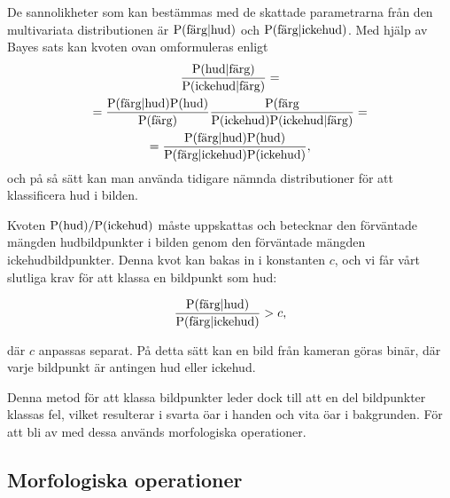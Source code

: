 \documentclass[../rapport_MVEX01-11-05]{subfiles}
\begin{document}
De sannolikheter som kan bestämmas med de skattade parametrarna från den
multivariata distributionen är
$\mathrm{P}(\textrm{färg}|\textrm{hud})$ och
$\mathrm{P}(\textrm{färg}|\textrm{ickehud})$. Med hjälp av Bayes sats
kan kvoten ovan omformuleras enligt
\begin{multline*}
\frac{\mathrm{P}(\textrm{hud}|\textrm{färg})}{\mathrm{P}(\textrm{ickehud}|\textrm{färg})}=\\
=\frac{\mathrm{P}(\textrm{färg}|\textrm{hud})\mathrm{P}(\textrm{hud})}{\mathrm{P}(\textrm{färg})}
 \frac{\mathrm{P}(\textrm{färg}}{\mathrm{P}(\textrm{ickehud})\mathrm{P}(\textrm{ickehud}|\textrm{färg})}=\\
=\frac{\mathrm{P}(\textrm{färg}|\textrm{hud})\mathrm{P}(\textrm{hud})}{\mathrm{P}(\textrm{färg}|\textrm{ickehud})
 \mathrm{P}(\textrm{ickehud})},
\end{multline*}
och på så sätt kan man använda tidigare nämnda distributioner för att
klassificera hud i bilden. 

Kvoten $\mathrm{P}(\textrm{hud})/\mathrm{P}(\textrm{ickehud})$ måste uppskattas
och betecknar
den förväntade mängden hudbildpunkter i bilden genom den förväntade mängden
ickehudbildpunkter. Denna kvot kan bakas in i konstanten $c$, och vi
får vårt slutliga krav för att klassa en bildpunkt som hud:

\begin{equation*}
	\frac{\mathrm{P}(\textrm{färg}|\textrm{hud})}{\mathrm{P}(\textrm{färg}|\textrm{ickehud})} > c,
\end{equation*}

där $c$ anpassas separat. På detta sätt kan en bild från kameran göras
binär, där varje bildpunkt är antingen hud eller ickehud.

Denna metod för att klassa bildpunkter leder dock till att en del
bildpunkter klassas fel, vilket resulterar i svarta öar i handen
och vita öar i bakgrunden. För att bli av med dessa används
morfologiska operationer.

\subsection{Morfologiska operationer}\label{sec:morph}
\end{document}
